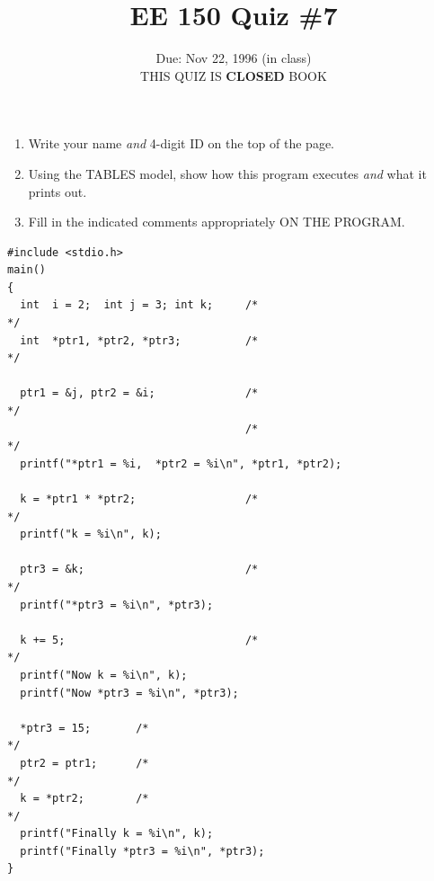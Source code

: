 \setcounter{page}{1}



\title{EE 150 Quiz \#7}
\author{Due: Nov 22, 1996 (in class) \\ {\large THIS QUIZ IS {\bf CLOSED} BOOK}}
\date{}
\maketitle

\begin{enumerate}
\item Write your name {\em and} 4-digit ID on the top of the page.
\item Using the TABLES model, show how this program executes {\em and} what
it prints out.
\item Fill in the indicated comments appropriately ON THE PROGRAM.
\end{enumerate}

\begin{verbatim}
#include <stdio.h>
main()
{
  int  i = 2;  int j = 3; int k;     /*                                   */
  int  *ptr1, *ptr2, *ptr3;          /*                                   */

  ptr1 = &j, ptr2 = &i;              /*                                   */
                                     /*                                   */
  printf("*ptr1 = %i,  *ptr2 = %i\n", *ptr1, *ptr2);

  k = *ptr1 * *ptr2;                 /*                                   */
  printf("k = %i\n", k);            

  ptr3 = &k;                         /*                                   */
  printf("*ptr3 = %i\n", *ptr3);    

  k += 5;                            /*                                   */
  printf("Now k = %i\n", k);         
  printf("Now *ptr3 = %i\n", *ptr3); 

  *ptr3 = 15;       /*                                                     */
  ptr2 = ptr1;      /*                                                     */
  k = *ptr2;        /*                                                     */
  printf("Finally k = %i\n", k);
  printf("Finally *ptr3 = %i\n", *ptr3);
}
\end{verbatim}


